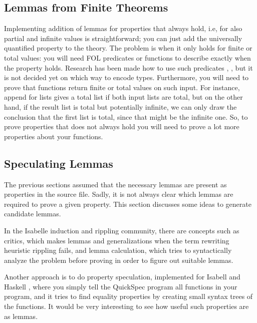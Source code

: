 \subsection{Lemmas from Finite Theorems}

Implementing addition of lemmas for properties that always hold, i.e,
for also partial and infinite values is straightforward; you can just
add the universally quantified property to the theory. The problem is
when it only holds for finite or total values: you will need FOL
predicates or functions to describe exactly when the property
holds. Research has been made how to use such predicates
\cite{sortMonotonicity}, \cite{polyMonotonicity}, but it is not
decided yet on which way to encode types. Furthermore, you will need
to prove that functions return finite or total values on such
input. For instance, append for lists gives a total list if both input
lists are total, but on the other hand, if the result list is total
but potentially infinite, we can only draw the conclusion that the
first list is total, since that might be the infinite one. So, to
prove properties that does not always hold you will need to prove a
lot more properties about your functions.

\subsection{Speculating Lemmas}

The previous sections assumed that the necessary lemmas are present as
properties in the source file. Sadly, it is not always clear which
lemmas are required to prove a given property. This section discusses
some ideas to generate candidate lemmas.


In the Isabelle induction and rippling community, there are concepts
such as critics, which makes lemmas and generalizations when the term
rewriting heuristic rippling fails, and lemma calculation, which tries
to syntactically analyze the problem before proving in order to figure
out suitable lemmas.

Another approach is to do property speculation, implemented for
Isabell \cite{isacosy} and Haskell \cite{quickspec}, where you simply
tell the QuickSpec program all functions in your program, and it tries
to find equality properties by creating small syntax trees of the
functions. It would be very interesting to see how useful such
properties are as lemmas.

